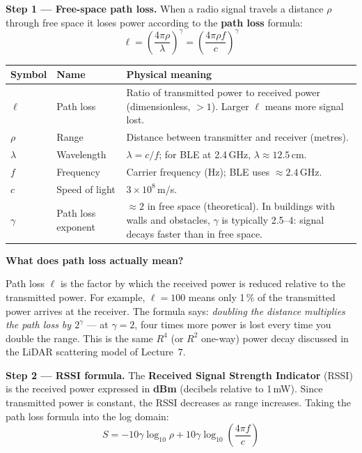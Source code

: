\documentclass[12pt, a4paper]{article}
\begin{document}
\textbf{Step 1 --- Free-space path loss.}
When a radio signal travels a distance $\rho$ through free space it
loses power according to the \textbf{path loss} formula:
\[
  \ell = \left(\frac{4\pi\rho}{\lambda}\right)^{\!\gamma}
       = \left(\frac{4\pi\rho f}{c}\right)^{\!\gamma}
\]

\begin{center}
\begin{tabular}{@{} l p{4.0cm} p{7.0cm} @{}}
  \toprule
  Symbol & Name & Physical meaning \\
  \midrule
  $\ell$ & Path loss & Ratio of transmitted power to received power
    (dimensionless, $> 1$).  Larger $\ell$ means more signal lost. \\
  $\rho$ & Range & Distance between transmitter and receiver (metres). \\
  $\lambda$ & Wavelength & $\lambda = c/f$; for BLE at 2.4\,GHz,
    $\lambda \approx 12.5$\,cm. \\
  $f$ & Frequency & Carrier frequency (Hz); BLE uses $\approx 2.4$\,GHz. \\
  $c$ & Speed of light & $3\times10^8$\,m/s. \\
  $\gamma$ & Path loss exponent & $\approx 2$ in free space (theoretical).
    In buildings with walls and obstacles, $\gamma$ is typically
    2.5--4: signal decays faster than in free space. \\
  \bottomrule
\end{tabular}
\end{center}

\begin{notebox}
  \textbf{What does path loss actually mean?}

  Path loss $\ell$ is the factor by which the received power is reduced
  relative to the transmitted power.
  For example, $\ell = 100$ means only 1\,\% of the transmitted power
  arrives at the receiver.
  The formula says: \emph{doubling the distance multiplies the path loss
  by $2^\gamma$} --- at $\gamma=2$, four times more power is lost
  every time you double the range.
  This is the same $R^4$ (or $R^2$ one-way) power decay discussed in the
  LiDAR scattering model of Lecture~7.
\end{notebox}

\textbf{Step 2 --- RSSI formula.}
The \textbf{Received Signal Strength Indicator} (RSSI) is the received
power expressed in \textbf{dBm} (decibels relative to 1\,mW).
Since transmitted power is constant, the RSSI decreases as range
increases.
Taking the path loss formula into the log domain:
\[
  S = -10\gamma \log_{10}\rho
      + 10\gamma \log_{10}\!\left(\frac{4\pi f}{c}\right)
\]
\end{document}
